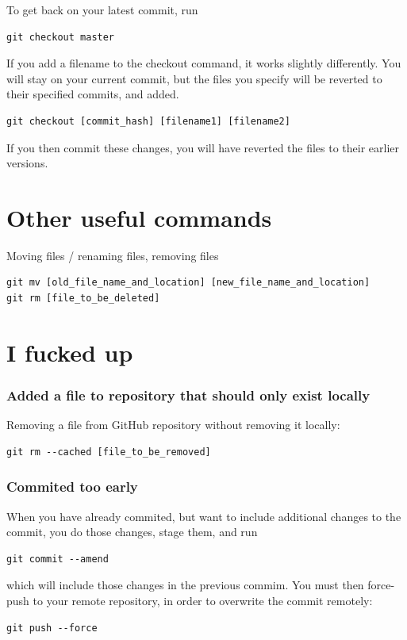 \documentclass[12p,a4paper]{article}
\begin{document}
To get back on your latest commit, run
\begin{verbatim}
git checkout master
\end{verbatim}

If you add a filename to the checkout command, it works slightly differently. You will stay on your current commit, but the files you specify will be reverted to their specified commits, and added.
\begin{verbatim}
git checkout [commit_hash] [filename1] [filename2]
\end{verbatim}
If you then commit these changes, you will have reverted the files to their earlier versions.


\section{Other useful commands}
Moving files / renaming files, removing files
\begin{verbatim}
git mv [old_file_name_and_location] [new_file_name_and_location]
git rm [file_to_be_deleted]
\end{verbatim}

\section{I fucked up}
\subsubsection{Added a file to repository that should only exist locally}
Removing a file from GitHub repository without removing it locally:
\begin{verbatim}
git rm --cached [file_to_be_removed]
\end{verbatim}


\subsubsection{Commited too early}
When you have already commited, but want to include additional changes to the commit, you do those changes, stage them, and run
\begin{verbatim}
git commit --amend
\end{verbatim}
which will include those changes in the previous commim. You must then force-push to your remote repository, in order to overwrite the commit remotely:
\begin{verbatim}
git push --force
\end{verbatim}
\end{document}
